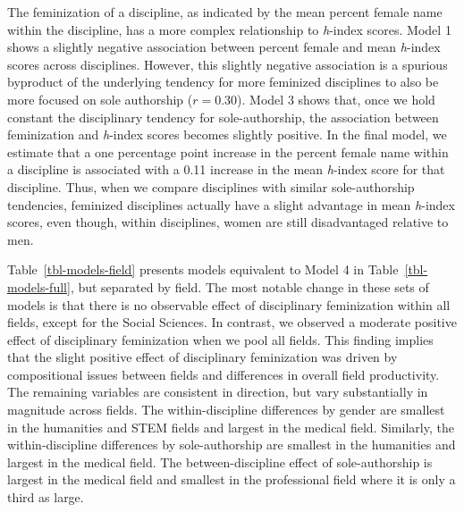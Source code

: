 \documentclass[
  10pt,
  letterpaper,
]{article}
\begin{document}
The feminization of a discipline, as indicated by the mean percent
female name within the discipline, has a more complex relationship to
\emph{h}-index scores. Model 1 shows a slightly negative association
between percent female and mean \emph{h}-index scores across
disciplines. However, this slightly negative association is a spurious
byproduct of the underlying tendency for more feminized disciplines to
also be more focused on sole authorship (\(r=0.30\)). Model 3 shows
that, once we hold constant the disciplinary tendency for
sole-authorship, the association between feminization and \emph{h}-index
scores becomes slightly positive. In the final model, we estimate that a
one percentage point increase in the percent female name within a
discipline is associated with a 0.11 increase in the mean \emph{h}-index
score for that discipline. Thus, when we compare disciplines with
similar sole-authorship tendencies, feminized disciplines actually have
a slight advantage in mean \emph{h}-index scores, even though, within
disciplines, women are still disadvantaged relative to men.

Table~\ref{tbl-models-field} presents models equivalent to Model 4 in
Table~\ref{tbl-models-full}, but separated by field. The most notable
change in these sets of models is that there is no observable effect of
disciplinary feminization within all fields, except for the Social
Sciences. In contrast, we observed a moderate positive effect of
disciplinary feminization when we pool all fields. This finding implies
that the slight positive effect of disciplinary feminization was driven
by compositional issues between fields and differences in overall field
productivity. The remaining variables are consistent in direction, but
vary substantially in magnitude across fields. The within-discipline
differences by gender are smallest in the humanities and STEM fields and
largest in the medical field. Similarly, the within-discipline
differences by sole-authorship are smallest in the humanities and
largest in the medical field. The between-discipline effect of
sole-authorship is largest in the medical field and smallest in the
professional field where it is only a third as large.
\end{document}
